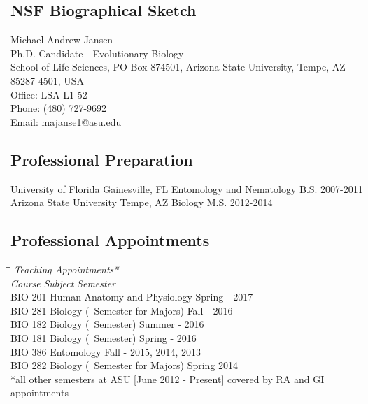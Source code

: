 \documentclass[11pt,a4paper]{extarticle}
\begin{document}
\subsection*{NSF Biographical Sketch}
	Michael Andrew Jansen
	\\
	Ph.D. Candidate - Evolutionary Biology
	\\
	School of Life Sciences, PO Box 874501, Arizona State University, Tempe, AZ 85287-4501, USA
	\\
	Office: LSA L1-52
	\\
	Phone: (480) 727-9692
	\\
	Email: \href{mailto:majanse1@asu.edu}{majanse1@asu.edu}
	
\subsection*{Professional Preparation}
	University of Florida \tabto*{2in} Gainesville, FL \tabto*{3.25in} Entomology and Nematology \tabto*{5.35in} B.S. 2007-2011
	\\
	Arizona State University \tabto*{2in} Tempe, AZ \tabto*{3.25in} Biology \tabto*{5.35in} M.S. 2012-2014

\subsection*{Professional Appointments}
	\begin{tabbing}
		\hspace{5cm}\=\hspace{7.75cm}\=\kill
		\textit{Teaching Appointments*}\\
		\textit{Course} \> \textit{Subject} \> \textit{Semester} \\
		BIO 201 \> Human Anatomy and Physiology \> Spring - 2017 \\ 
		BIO 281 \> Biology (~Semester for Majors) \> Fall - 2016 \\ 
		BIO 182 \> Biology (~Semester) \> Summer - 2016 \\ 
		BIO 181 \> Biology (~Semester) \> Spring - 2016 \\ 
		BIO 386 \> Entomology \> Fall - 2015, 2014, 2013 \\ 
		BIO 282 \> Biology (~Semester for Majors) \> Spring 2014\\
		\smallskip
		\footnotesize{*all other semesters at ASU [June 2012 - Present] covered by RA and GI appointments}
	\end{tabbing} 
\end{document}
